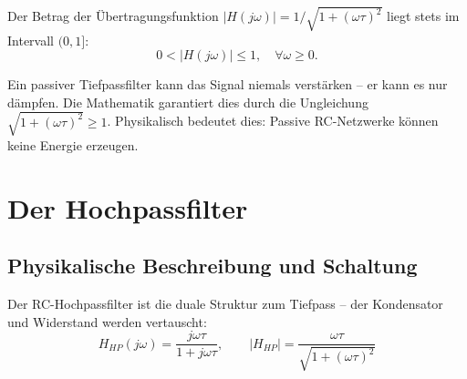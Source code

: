 ﻿\documentclass[12pt, a4paper]{article}
\begin{document}
	Der Betrag der Übertragungsfunktion $|H(j\omega)| = 1/\sqrt{1+(\omega\tau)^2}$ liegt stets im Intervall $(0,1]$:
	\begin{equation}
		0 < |H(j\omega)| \leq 1, \quad \forall \omega \geq 0.
	\end{equation}
	
	Ein passiver Tiefpassfilter kann das Signal niemals verstärken -- er kann es nur dämpfen. Die Mathematik garantiert dies durch die Ungleichung $\sqrt{1+(\omega\tau)^2} \geq 1$. Physikalisch bedeutet dies: Passive RC-Netzwerke können keine Energie erzeugen.
	
	\section{Der Hochpassfilter}
	
	\subsection{Physikalische Beschreibung und Schaltung}
	
	Der RC-Hochpassfilter ist die duale Struktur zum Tiefpass -- der Kondensator und Widerstand werden vertauscht:
	\begin{equation}
		H_{HP}(j\omega) = \frac{j\omega\tau}{1 + j\omega\tau}, \qquad |H_{HP}| = \frac{\omega\tau}{\sqrt{1+(\omega\tau)^2}}
	\end{equation}
	
\end{document}
